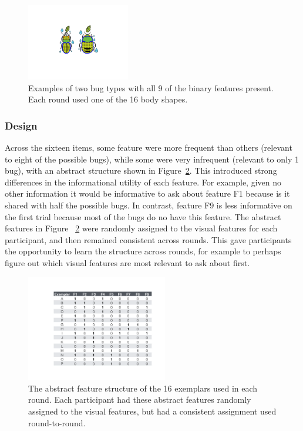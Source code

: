 \documentclass[man,floatsintext]{apa6}
\begin{document}
\begin{figure}[h]
  \centering
  \includegraphics[width=0.4\textwidth]{figures/example_bugs}
  \caption{Examples of two bug types with all 9 of the binary features present. Each round used one of the 16 
body shapes. } %
  \label{fig:example_bugs}
\end{figure} 

\subsubsection{Design}

Across the sixteen items, some feature were more frequent than others (relevant to eight of the possible
bugs), while some were very infrequent (relevant to only 1 bug), with an
abstract structure shown in Figure~\ref{fig:feature_table}. This introduced
strong differences in the informational utility of each feature.  For example,
given no other information it would be informative to ask about feature F1
because is it shared with half the possible bugs.  In contrast, feature
F9 is less informative on the first trial because most of the bugs do no have this
feature. The abstract features in Figure~
\ref{fig:feature_table} were randomly assigned to the visual features for each 
participant, and then remained consistent across rounds. This gave participants the 
opportunity to learn the structure across rounds, for example to perhaps figure out 
which visual features are most relevant to ask about first.

\begin{figure}[h]
  \centering
  \includegraphics[width=0.55\textwidth]{figures/feature_table}
  \caption{The abstract feature structure of the 16 exemplars used in each round. 
Each participant had these abstract features randomly assigned to the visual 
features, but had a consistent assignment used round-to-round.}
  \label{fig:feature_table}
\end{figure} 
\end{document}
